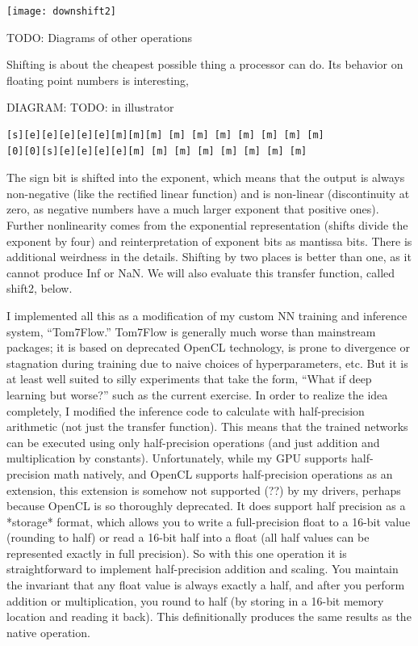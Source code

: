 \documentclass[twocolumn]{article}
\begin{document}
\begin{center}
\texttt{[image: downshift2]}
\end{center}

TODO: Diagrams of other operations

Shifting is about the cheapest possible thing a processor can do. Its behavior on floating point numbers is interesting,

DIAGRAM: TODO: in illustrator

\begin{verbatim}
[s][e][e][e][e][e][m][m][m] [m] [m] [m] [m] [m] [m] [m]
[0][0][s][e][e][e][e][m] [m] [m] [m] [m] [m] [m] [m]
\end{verbatim}

The sign bit is shifted into the exponent, which means that the output is always non-negative (like the rectified linear function) and is non-linear (discontinuity at zero, as negative numbers have a much larger exponent that positive ones). Further nonlinearity comes from the exponential representation (shifts divide the exponent by four) and reinterpretation of exponent bits as mantissa bits. There is additional weirdness in the details. Shifting by two places is better than one, as it cannot produce Inf or NaN. We will also evaluate this transfer function, called shift2, below.

I implemented all this as a modification of my custom NN training and inference system, ``Tom7Flow.'' Tom7Flow is generally much worse than mainstream packages; it is based on deprecated OpenCL technology, is prone to divergence or stagnation during training due to naive choices of hyperparameters, etc. But it is at least well suited to silly experiments that take the form, ``What if deep learning but worse?'' such as the current exercise. In order to realize the idea completely, I modified the inference code to calculate with half-precision arithmetic (not just the transfer function). This means that the trained networks can be executed using only half-precision operations (and just addition and multiplication by constants). Unfortunately, while my GPU supports half-precision math natively, and OpenCL supports half-precision operations as an extension, this extension is somehow not supported (??) by my drivers, perhaps because OpenCL is so thoroughly deprecated. It does support half precision as a *storage* format, which allows you to write a full-precision float to a 16-bit value (rounding to half) or read a 16-bit half into a float (all half values can be represented exactly in full precision). So with this one operation it is straightforward to implement half-precision addition and scaling. You maintain the invariant that any float value is always exactly a half, and after you perform addition or multiplication, you round to half (by storing in a 16-bit memory location and reading it back). This definitionally produces the same results as the native operation.
\end{document}
